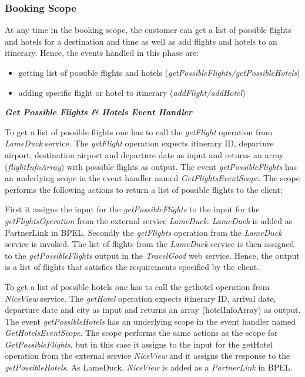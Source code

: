\subsubsection*{Booking Scope}

At any time in the booking scope, the customer can get a list of possible flights and hotels for a destination and time as well as add flights and hotels to an itinerary. Hence, the events handled in this phase are:
\begin{itemize}
\item getting list of possible flights and hotels (\textit{getPossibleFlights/getPossibleHotels})
\item adding specific flight or hotel to itinerary (\textit{addFlight/addHotel})
\end{itemize}

\textbf{\textit{Get Possible Flights \& Hotels Event Handler}}

To get a list of possible flights one has to call the \textit{getFlight} operation from \textit{LameDuck} service. The \textit{getFlight} operation expects itinerary ID, departure airport, destination airport and departure date as input and returns an array (\textit{flightInfoArray}) with possible flights as output. The event \textit{getPossibleFlights} has an underlying scope in the event handler named \textit{GetFlightsEventScope}. The scope performs the following actions to return a list of possible flights to the client:
 
First it assigns the input for the \textit{getPossibleFlights} to the input for the \textit{getFlightsOperation} from the external service \textit{LameDuck}. \textit{LameDuck} is added as PartnerLink in BPEL.
Secondly the \textit{getFlights} operation from the \textit{LameDuck} service is invoked.
The list of flights from the \textit{LameDuck} service is then assigned to the \textit{getPossibleFlights} output in the \textit{TravelGood} web service. Hence, the output is a list of flights that satisfies the requirements specified by the client.
 
To get a list of possible hotels one has to call the gethotel operation from \textit{NiceView} service. The \textit{getHotel} operation expects itinerary ID, arrival date, departure date and city as input and returns an array (hotelInfoArray) as output. The event \textit{getPossibleHotels} has an underlying scope in the event handler named \textit{GetHotelsEventScope}. The scope performs the same actions as the scope for \textit{GetPossibleFlights}, but in this case it assigns to the input for the getHotel operation from the external service \textit{NiceView} and it assigns the response to the \textit{getPossibleHotels}. As LameDuck, \textit{NiceView} is added as a \textit{PartnerLink} in BPEL.


